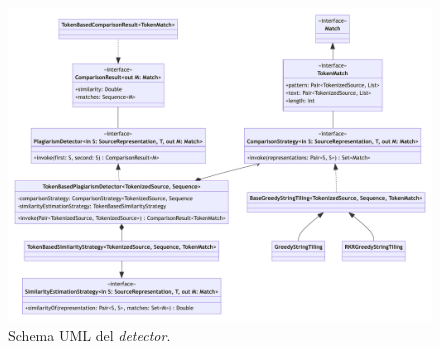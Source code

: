 \begin{figure}[h!]
    \centering
    \includegraphics[width=\textwidth]{resources/img/02-detector.pdf}
    \caption{Schema UML del \textit{detector}.}
    \label{img:02-detector}
\end{figure}
